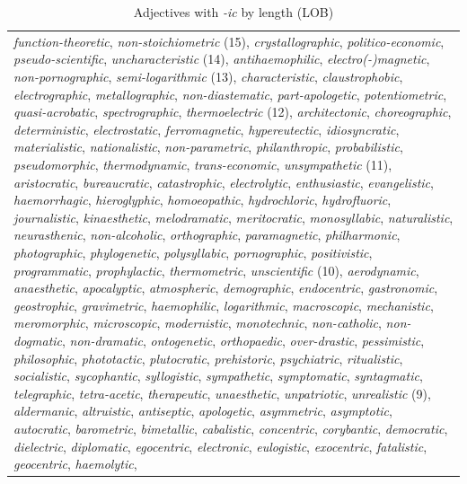 \begin{table}
\footnotesize
\caption{Adjectives with \textit{-ic} by length (LOB) \label{tab:iclength}}
\begin{tabularx}{\textwidth}{Q}
\lsptoprule
\textit{function\hyp{}theoretic}, \textit{non-stoichiometric} (15), \textit{crystallographic}, \textit{politico-economic}, \textit{pseudo-scientific}, \textit{uncharacteristic} (14), \textit{antihaemophilic}, \textit{electro(-)magnetic}, \textit{non-pornographic}, \textit{semi-logarithmic} (13), \textit{characteristic}, \textit{claustrophobic}, \textit{electrographic}, \textit{metallographic}, \textit{non-diastematic}, \textit{part-apologetic}, \textit{potentiometric}, \textit{quasi-acrobatic}, \textit{spectrographic}, \textit{thermoelectric} (12), \textit{architectonic}, \textit{choreographic}, \textit{deterministic}, \textit{electrostatic}, \textit{ferromagnetic}, \textit{hypereutectic}, \textit{idiosyncratic}, \textit{materialistic}, \textit{nationalistic}, \textit{non-parametric}, \textit{philanthropic}, \textit{probabilistic}, \textit{pseudomorphic}, \textit{thermodynamic}, \textit{trans-economic}, \textit{unsympathetic} (11), \textit{aristocratic}, \textit{bureaucratic}, \textit{catastrophic}, \textit{electrolytic}, \textit{enthusiastic}, \textit{evangelistic}, \textit{haemorrhagic}, \textit{hieroglyphic}, \textit{homoeopathic}, \textit{hydrochloric}, \textit{hydrofluoric}, \textit{journalistic}, \textit{kinaesthetic}, \textit{melodramatic}, \textit{meritocratic}, \textit{monosyllabic}, \textit{naturalistic}, \textit{neurasthenic}, \textit{non-alcoholic}, \textit{orthographic}, \textit{paramagnetic}, \textit{philharmonic}, \textit{photographic}, \textit{phylogenetic}, \textit{polysyllabic}, \textit{pornographic}, \textit{positivistic}, \textit{programmatic}, \textit{prophylactic}, \textit{thermometric}, \textit{unscientific} (10), \textit{aerodynamic}, \textit{anaesthetic}, \textit{apocalyptic}, \textit{atmospheric}, \textit{demographic}, \textit{endocentric}, \textit{gastronomic}, \textit{geostrophic}, \textit{gravimetric}, \textit{haemophilic}, \textit{logarithmic}, \textit{macroscopic}, \textit{mechanistic}, \textit{meromorphic}, \textit{microscopic}, \textit{modernistic}, \textit{monotechnic}, \textit{non-catholic}, \textit{non-dogmatic}, \textit{non-dramatic}, \textit{ontogenetic}, \textit{orthopaedic}, \textit{over-drastic}, \textit{pessimistic}, \textit{philosophic}, \textit{phototactic}, \textit{plutocratic}, \textit{prehistoric}, \textit{psychiatric}, \textit{ritualistic}, \textit{socialistic}, \textit{sycophantic}, \textit{syllogistic}, \textit{sympathetic}, \textit{symptomatic}, \textit{syntagmatic}, \textit{telegraphic}, \textit{tetra-acetic}, \textit{therapeutic}, \textit{unaesthetic}, \textit{unpatriotic}, \textit{unrealistic} (9), \textit{aldermanic}, \textit{altruistic}, \textit{antiseptic}, \textit{apologetic}, \textit{asymmetric}, \textit{asymptotic}, \textit{autocratic}, \textit{barometric}, \textit{bimetallic}, \textit{cabalistic}, \textit{concentric}, \textit{corybantic}, \textit{democratic}, \textit{dielectric}, \textit{diplomatic}, \textit{egocentric}, \textit{electronic}, \textit{eulogistic}, \textit{exocentric}, \textit{fatalistic}, \textit{geocentric}, \textit{haemolytic}, 
\end{tabularx}
\end{table}
